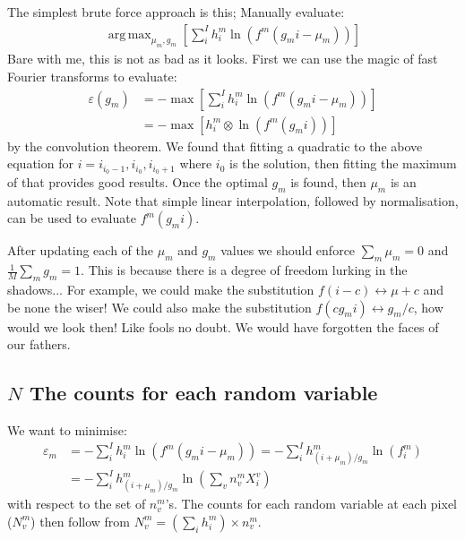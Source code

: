 \documentclass[11pt]{article}
\DeclareMathOperator*{\argmax}{arg\,max}
\begin{document}
The simplest brute force approach is this; Manually evaluate:
\begin{align}
   \argmax_{\mu_m, g_m}\left[ \sum_i^I h^m_i \ln(f^m(g_m i - \mu_m)) \right]
\end{align}  
Bare with me, this is not as bad as it looks. First we can use the magic of fast Fourier transforms to evaluate:
\begin{align}
   \varepsilon(g_m) &= -\max\left[ \sum_i^I h^m_i \ln(f^m(g_m i - \mu_m)) \right] \\
   &= -\max\left[ h^m_i \otimes \ln(f^m(g_m i)) \right] 
\end{align}  
by the convolution theorem. We found that fitting a quadratic to the above equation for $i = i_{i_0-1}, i_{i_0}, i_{i_0+1}$ where $i_0$ is the solution, then fitting the maximum of that provides good results. 
Once the optimal $g_m$ is found, then $\mu_m$ is an automatic result. Note that simple linear interpolation, followed by normalisation, can be used to evaluate $f^m(g_m i)$.  

After updating each of the $\mu_m$ and $g_m$ values we should enforce $\sum_m \mu_m = 0$ and $\frac{1}{M}\sum_m g_m = 1$. This is because there is a degree of freedom lurking in the shadows... For example, we could make the substitution $f(i - c) \leftrightarrow \mu + c$ and be none the wiser! We could also make the substitution $f(c g_m i) \leftrightarrow g_m / c$, how would we look then! Like fools no doubt. We would have forgotten the faces of our fathers. 
 
 
 
 
 
 
 
 
 
 
 
 
 
 
 
 
\subsection{$N$ The counts for each random variable}
We want to minimise:
\begin{align}
   \varepsilon_m &= -\sum_i^I h^m_i \ln(f^m(g_mi - \mu_m)) = -\sum_i^I h^m_{(i+\mu_m)/g_m} \ln(f^m_i) \\
   &= - \sum_i^I h^m_{(i+\mu_m)/g_m} \ln\left(\sum_v n^m_v X^v_i\right)
\end{align}
with respect to the set of $n^m_v$'s. The counts for each random variable at each pixel ($N^m_v$) then follow from $N^m_v = (\sum_i h^m_i) \times n^m_v$.
\end{document}
